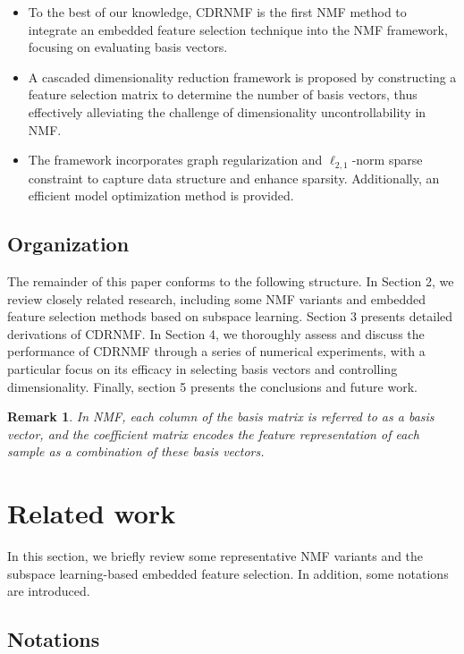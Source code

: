 \documentclass[a4paper,fleqn]{cas-sc}
\newtheorem{remark}{Remark}
\begin{document}
\begin{itemize}
	\item To the best of our knowledge, CDRNMF is the first NMF method to integrate an embedded feature selection technique into the NMF framework, focusing on evaluating basis vectors.
	
	\item A cascaded dimensionality reduction framework is proposed by constructing a feature selection matrix to determine the number of basis vectors, thus effectively alleviating the challenge of dimensionality uncontrollability in NMF.
	
	\item The framework incorporates graph regularization and $\ell_{2,1}$-norm sparse constraint to capture data structure and enhance sparsity. Additionally, an efficient model optimization method is provided.
\end{itemize}

\subsection{Organization}

The remainder of this paper conforms to the following structure. In Section 2, we review closely related research, including some NMF variants and embedded feature selection methods based on subspace learning. Section 3 presents detailed derivations of CDRNMF. In Section 4, we thoroughly assess and discuss the performance of CDRNMF through a series of numerical experiments, with a particular focus on its efficacy in selecting basis vectors and controlling dimensionality. Finally, section 5 presents the conclusions and future work.

\begin{remark}
	In NMF, each column of the basis matrix is referred to as a basis vector, and the coefficient matrix encodes the feature representation of each sample as a combination of these basis vectors.
\end{remark}

\section{Related work}
\label{Related work}

In this section, we briefly review some representative NMF variants and the subspace learning-based embedded feature selection. In addition, some notations are introduced.

\subsection{Notations}
\end{document}
